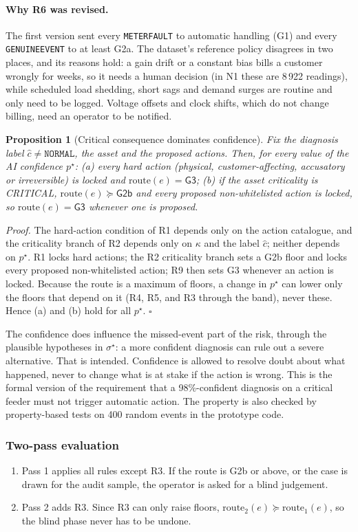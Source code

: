 \documentclass[11pt,a4paper]{article}
\newtheorem{proposition}{Proposition}
\renewcommand{\_}{\textunderscore\allowbreak}
\providecommand{\GE}{\texttt{GENUINE\_EVENT}}
\providecommand{\MF}{\texttt{METER\_FAULT}}
\providecommand{\NORM}{\texttt{NORMAL}}
\newcommand{\lvl}[1]{\textsf{#1}}
\begin{document}
\paragraph{Why R6 was revised.} The first version sent every \MF{} to automatic handling (\lvl{G1}) and every
\GE{} to at least \lvl{G2a}. The dataset's reference policy disagrees in two places, and its reasons hold:
a gain drift or a constant bias bills a customer wrongly for weeks, so it needs a human decision (in N1 these
are 8\,922 readings), while scheduled load shedding, short sags and demand surges are routine and only need to
be logged. Voltage offsets and clock shifts, which do not change billing, need an operator to be notified.

\begin{proposition}[Critical consequence dominates confidence]
Fix the diagnosis label $\hat c\ne\NORM$, the asset and the proposed actions. Then, for every value of the AI
confidence $p^\star$: (a) every hard action (physical, customer-affecting, accusatory or irreversible) is locked
and $\mathrm{route}(e)=\lvl{G3}$; (b) if the asset criticality is CRITICAL, $\mathrm{route}(e)\succeq\lvl{G2b}$ and
every proposed non-whitelisted action is locked, so $\mathrm{route}(e)=\lvl{G3}$ whenever one is proposed.
\end{proposition}
\noindent\textit{Proof.} The hard-action condition of R1 depends only on the action catalogue, and the
criticality branch of R2 depends only on $\kappa$ and the label $\hat c$; neither depends on $p^\star$. R1 locks
hard actions; the R2 criticality branch sets a \lvl{G2b} floor and locks every proposed non-whitelisted action;
R9 then sets \lvl{G3} whenever an action is locked. Because the route is a maximum of floors, a change in
$p^\star$ can lower only the floors that depend on it (R4, R5, and R3 through the band), never these. Hence (a)
and (b) hold for all $p^\star$. $\square$

The confidence does influence the missed-event part of the risk, through the plausible hypotheses in
$\sigma^\star$: a more confident diagnosis can rule out a severe alternative. That is intended. Confidence is
allowed to resolve doubt about what happened, never to change what is at stake if the action is wrong. This is
the formal version of the requirement that a 98\%-confident diagnosis on a critical feeder must not trigger
automatic action. The property is also checked by property-based tests on 400 random events in the prototype
code.

\subsubsection{Two-pass evaluation}
\begin{enumerate}[leftmargin=*,itemsep=1pt]
\item Pass 1 applies all rules except R3. If the route is \lvl{G2b} or above, or the case is drawn for the
audit sample, the operator is asked for a blind judgement.
\item Pass 2 adds R3. Since R3 can only raise floors, $\mathrm{route}_2(e)\succeq\mathrm{route}_1(e)$, so the
blind phase never has to be undone.
\end{enumerate}
\end{document}
